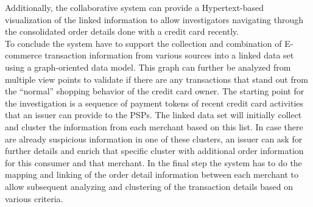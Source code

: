 Additionally, the collaborative system can provide a Hypertext-based visualization of the linked information to allow investigators navigating through the consolidated order details done with a credit card recently. \\

To conclude the system have to support the collection and combination of \gls{E-commerce} transaction information from various sources into a linked data set using a graph-oriented data model. This graph can further be analyzed from multiple view points to validate if there are any transactions that stand out from the ``normal'' shopping behavior of the credit card owner. The starting point for the investigation is a sequence of payment tokens of recent credit card activities that an issuer can provide to the \gls{PSP}s. The linked data set will initially collect and cluster the information from each merchant based on this list. In case there are already suspicious information in one of these clusters, an issuer can ask for further details and enrich that specific cluster with additional order information for this consumer and that merchant. In the final step the system has to do the mapping and linking of the order detail information between each merchant to allow subsequent analyzing and clustering of the transaction details based on various criteria.

